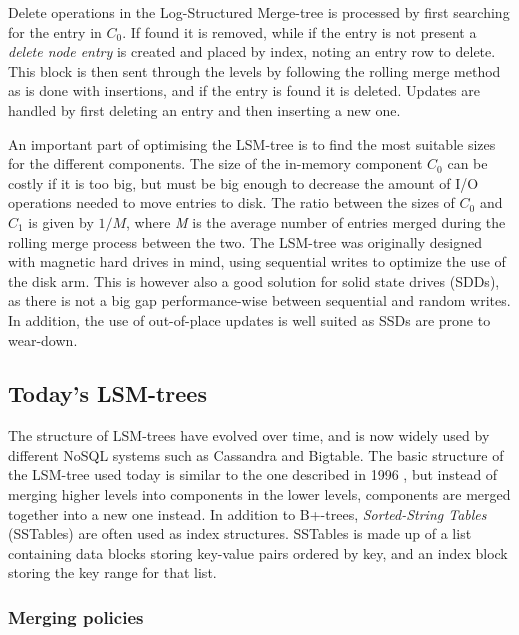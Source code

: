 \noindent
Delete operations in the Log-Structured Merge-tree is processed by first searching for the entry in $C_0$. If found it is removed, while if the entry is not present a \emph{delete node entry} is created and placed by index, noting an entry row to delete. This block is then sent through the levels by following the rolling merge method as is done with insertions, and if the entry is found it is deleted. Updates are handled by first deleting an entry and then inserting a new one.
\newline

\noindent
An important part of optimising the LSM-tree is to find the most suitable sizes for the different components. The size of the in-memory component $C_0$ can be costly if it is too big, but must be big enough to decrease the amount of I/O operations needed to move entries to disk. The ratio between the sizes of $C_0$ and $C_1$ is given by $1/M$, where \emph{M} is the average number of entries merged during the rolling merge process between the two. The LSM-tree was originally designed with magnetic hard drives in mind, using sequential writes to optimize the use of the disk arm. This is however also a good solution for solid state drives (SDDs), as there is not a big gap performance-wise between sequential and random writes. In addition, the use of out-of-place updates is well suited as SSDs are prone to wear-down\cite{LSMSDD}.

\subsection{Today's LSM-trees}
The structure of LSM-trees have evolved over time, and is now widely used by different NoSQL systems such as Cassandra\cite{Cassandra} and Bigtable\cite{Bigtable}. The basic structure of the LSM-tree used today is similar to the one described in 1996 \cite{LSMTree}, but instead of merging higher levels into components in the lower levels, components are merged together into a new one instead\cite{LSMSurvey}. In addition to B+-trees, \emph{Sorted-String Tables} (SSTables) are often used as index structures. SSTables is made up of a list containing data blocks storing key-value pairs ordered by key, and an index block storing the key range for that list. 

\subsubsection{Merging policies}


